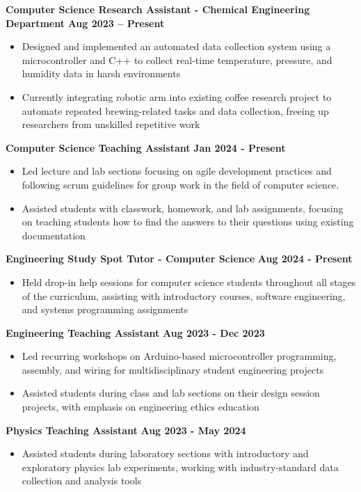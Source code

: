 \documentclass{article}
\begin{document}
\textbf{Computer Science Research Assistant - Chemical Engineering Department} \hfill \textbf{Aug 2023 – Present}
\begin{itemize}[noitemsep,topsep=2pt]
    \item Designed and implemented an automated data collection system using a microcontroller and C++ to collect real-time temperature, pressure, and humidity data in harsh environments
    \item Currently integrating robotic arm into existing coffee research project to automate repeated brewing-related tasks and data collection, freeing up researchers from unskilled repetitive work
\end{itemize}

\textbf{Computer Science Teaching Assistant} \hfill \textbf{Jan 2024 - Present}
\begin{itemize}[noitemsep,topsep=2pt]
	\item Led lecture and lab sections focusing on agile development practices and following scrum guidelines for group work in the field of computer science.
	\item Assisted students with classwork, homework, and lab assignments, focusing on teaching students how to find the answers to their questions using existing documentation
\end{itemize}

\textbf{Engineering Study Spot Tutor - Computer Science} \hfill \textbf{Aug 2024 - Present}
\begin{itemize}[noitemsep,topsep=2pt]
	\item Held drop-in help sessions for computer science students throughout all stages of the curriculum, assisting with introductory courses, software engineering, and systems programming assignments
\end{itemize}

\textbf{Engineering Teaching Assistant} \hfill \textbf{Aug 2023 - Dec 2023}
\begin{itemize}[noitemsep,topsep=2pt]
	\item Led recurring workshops on Arduino-based microcontroller programming, assembly, and wiring for multidisciplinary student engineering projects
	\item Assisted students during class and lab sections on their design session projects, with emphasis on engineering ethics education
\end{itemize}

\textbf{Physics Teaching Assistant} \hfill \textbf{Aug 2023 - May 2024}
\begin{itemize}[noitemsep,topsep=2pt]
	\item Assisted students during laboratory sections with introductory and exploratory physics lab experiments, working with industry-standard data collection and analysis tools\\
\end{itemize}
\end{document}
